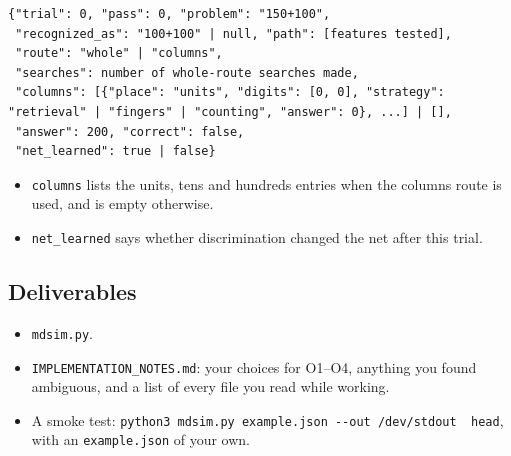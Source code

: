 \begin{Verbatim}[breaklines,breakanywhere,fontsize=\footnotesize]
{"trial": 0, "pass": 0, "problem": "150+100",
 "recognized_as": "100+100" | null, "path": [features tested],
 "route": "whole" | "columns",
 "searches": number of whole-route searches made,
 "columns": [{"place": "units", "digits": [0, 0], "strategy": "retrieval" | "fingers" | "counting", "answer": 0}, ...] | [],
 "answer": 200, "correct": false,
 "net_learned": true | false}
\end{Verbatim}

\begin{itemize}
\tightlist
\item
  \texttt{columns} lists the units, tens and hundreds entries when the columns route is used, and is empty otherwise.
\item
  \texttt{net\_learned} says whether discrimination changed the net after this trial.
\end{itemize}

\subsection{Deliverables}\label{deliverables}

\begin{itemize}
\tightlist
\item
  \texttt{mdsim.py}.
\item
  \texttt{IMPLEMENTATION\_NOTES.md}: your choices for O1--O4, anything you found ambiguous, and a list of every file you read while working.
\item
  A smoke test: \texttt{python3\ mdsim.py\ example.json\ -\/-out\ /dev/stdout\ \textbar{}\ head}, with an \texttt{example.json} of your own.
\end{itemize}
